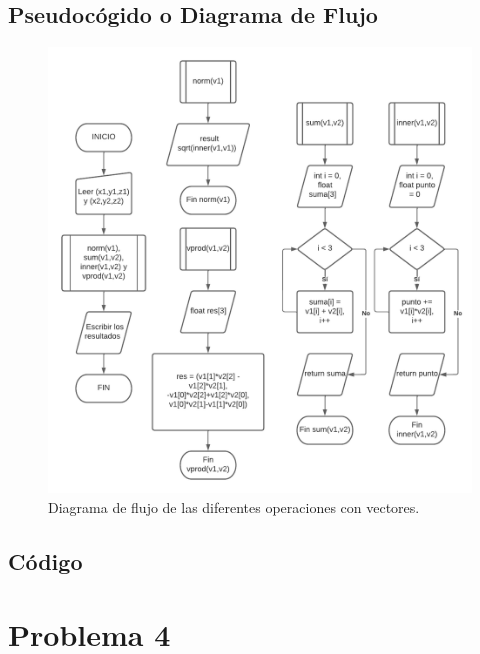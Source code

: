 \subsection{Pseudocógido o Diagrama de Flujo}
\begin{figure}[H]
	\centering
	\includegraphics[scale=0.6]{img/problema3.pdf}
	\caption{Diagrama de flujo de las diferentes operaciones con vectores.}
	\label{DFp5}
\end{figure}


\subsection{Código}


\section{Problema 4}
